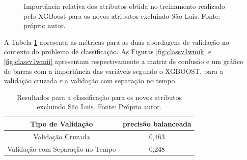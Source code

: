 \begin{figure}[h]
\center
{}
\caption{Importância relativa dos atributos obtida no treinamento realizado pelo XGBoost para os novos atributos excluindo São Luis. Fonte: próprio autor.}\label{fig:regv1w}
\end{figure}

A Tabela \ref{tab:results_v1_w_class} apresenta as métricas para as duas abordagens de validação no contexto do problema de classificação. As Figuras \ref{fig:classv1wmik} e \ref{fig:classv1wmii} apresentam respectivamente a matriz de confusão e um gráfico de barras com a importância das variáveis segundo o XGBOOST, para a validação cruzada e a validação com separação no tempo.

\begin{table}[h]
\begin{center}
\begin{tabular}{|c|c|}
\hline
Tipo de Validação & precisão balanceada   \\ \hline
Validação Cruzada                   & 0,463    \\ \hline
Validação com Separação no Tempo    & 0,248     \\ \hline
\end{tabular}
\end{center}
\vspace{12pt}
\caption{Resultados para a classificação  para os novos atributos excluindo São Luis. Fonte: Próprio autor.}
\label{tab:results_v1_w_class}
\end{table}

